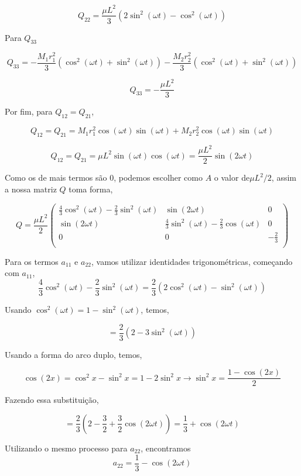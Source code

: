 \documentclass[11pt]{article}
\begin{document}
\begin{pproblem}
\begin{pssolution*}{}{}
\begin{alternativas}
        \[Q_{22} = \frac{\mu L^2}{3}(2\sin^2(\omega t) - \cos^2(\omega t))\]


        Para \(Q_{33}\)

        \[Q_{33} = -\frac{M_1r_1^2}{3}(\cos^2(\omega t) + \sin^2(\omega t))-\frac{M_2r_2^2}{3}(\cos^2(\omega t) + \sin^2(\omega t))\]

        \[Q_{33} = -\frac{\mu L^2}{3}\]

        Por fim, para \(Q_{12} = Q_{21}\), 

        \[Q_{12} = Q_{21} = M_1r_1^2\cos(\omega t) \sin(\omega t) + M_2r_2^2\cos(\omega t)\sin(\omega t)\]

        \[Q_{12} = Q_{21} = \mu L^2 \sin(\omega t)\cos(\omega t) = \frac{\mu L^2}{2}\sin(2\omega t)\]

        Como os de mais termos são \(0\), podemos escolher como \(A\) o valor de\(\mu L^2/2\), assim a nossa matriz \(Q\) toma forma, 

        \[Q = \frac{\mu L^2}{2}\left(\begin{matrix}
            \frac{4}{3}\cos^2(\omega t) - \frac{2}{3}\sin^2(\omega t)  & \sin(2\omega t) & 0 \\
            \sin(2\omega t) & \frac{4}{3}\sin^2(\omega t) - \frac{2}{3}\cos(\omega t) & 0 \\
            0 & 0 & -\frac{2}{3} \\
            \end{matrix}\right)\]

        Para os termos \(a_{11}\) e \(a_{22}\), vamos utilizar identidades trigonométricas, começando com \(a_{11}\), 
        \[\frac{4}{3}\cos^2(\omega t) - \frac{2}{3}\sin^2(\omega t) = \frac{2}{3}(2\cos^2(\omega t) - \sin^2(\omega t))\]

        Usando \(\cos^2(\omega t) = 1-\sin^2(\omega t)\), temos, 

        \[ = \frac{2}{3}\left(2-3\sin^{2}(\omega t)\right)\]

        Usando a forma do arco duplo, temos, 

        \[\cos(2x) = \cos^2x -\sin^2x = 1-2\sin^2x \rightarrow \sin^2x = \frac{1-\cos(2x)}{2}\]

        Fazendo essa substituição, 

        \[=\frac{2}{3}\left(2 - \frac{3}{2} + \frac{3}{2}\cos(2\omega t)\right) = \frac{1}{3}+\cos(2\omega t)\]

        Utilizando o mesmo processo para \(a_22\), encontramos
        \[a_{22} = \frac{1}{3}-\cos(2\omega t)\]


\end{alternativas}
\end{pssolution*}
\end{pproblem}
\end{document}

